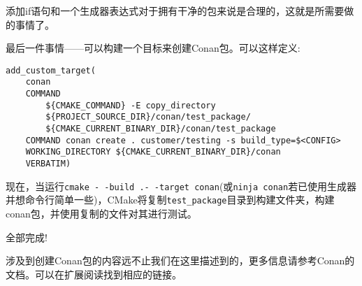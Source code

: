 添加if语句和一个生成器表达式对于拥有干净的包来说是合理的，这就是所需要做的事情了。

最后一件事情——可以构建一个目标来创建Conan包。可以这样定义:

\begin{lstlisting}[style=styleCMake]
add_custom_target(
	conan
	COMMAND
		${CMAKE_COMMAND} -E copy_directory
		${PROJECT_SOURCE_DIR}/conan/test_package/
		${CMAKE_CURRENT_BINARY_DIR}/conan/test_package
	COMMAND conan create . customer/testing -s build_type=$<CONFIG>
	WORKING_DIRECTORY ${CMAKE_CURRENT_BINARY_DIR}/conan
	VERBATIM)
\end{lstlisting}

现在，当运行\texttt{cmake -\,-build .-\,-target conan}(或\texttt{ninja conan}若已使用生成器并想命令行简单一些)，CMake将复制\texttt{test\_package}目录到构建文件夹，构建conan包，并使用复制的文件对其进行测试。

全部完成!

\begin{tcolorbox}[colback=blue!5!white,colframe=blue!75!black, title=Note]
\hspace*{0.7cm}涉及到创建Conan包的内容远不止我们在这里描述到的，更多信息请参考Conan的文档。可以在扩展阅读找到相应的链接。
\end{tcolorbox}








